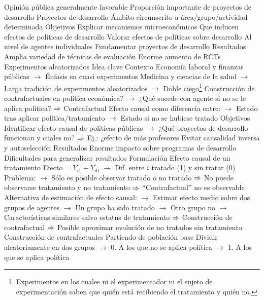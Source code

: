 \documentclass{nuevotema}
\begin{document}
\begin{esquemal}
				\4[] Opinión pública generalmente favorable
				\4[] Proporción importante de proyectos de desarrollo
				\4 Proyectos de desarrollo
				\4[] Ámbito circunscrito a área/grupo/actividad determinada
				\4[]
			\3 Objetivos
				\4 Explicar mecanismos microeconómicos
				\4[] Que inducen efectos de políticas de desarrollo
				\4 Valorar efectos de políticas sobre desarrollo
				\4[] Al nivel de agentes individuales
				\4 Fundamentar proyectos de desarrollo
			\3 Resultados
				\4 Amplia variedad de técnicas de evaluación
				\4 Enorme aumento de RCTs
		\2 Experimentos aleatorizados
			\3 Idea clave
				\4 Contexto
				\4[] Economía laboral y finanzas públicas
				\4[] $\to$ Énfasis en cuasi experimentos
				\4[] Medicina y ciencias de la salud
				\4[] $\to$ Larga tradición de experimentos aleatorizados
				\4[] $\to$ Doble ciego\footnote{Experimentos en los cuales ni el experimentador ni el sujeto de experimentación saben que quién está recibiendo el tratamiento y quién no.}
				\4[] Construcción de contrafactuales en política económica?
				\4[] $\to$ ¿Qué sucede con agente si no se le aplica política?
				\4[] $\Rightarrow$ Contrafactual
				\4[] Efecto causal como diferencia entre:
				\4[] $\to$ Estado tras aplicar política/tratamiento
				\4[] $\to$ Estado si no se hubiese tratado
				\4 Objetivos
				\4[] Identificar efecto causal de políticas públicas
				\4[] $\to$ ¿Qué proyectos de desarrollo funcionan y cuales no?
				\4[] $\Rightarrow$ Ej.: ¿efecto de más profesores
				\4[] Evitar causalidad inversa y autoselección
				\4 Resultados
				\4[] Enorme impacto sobre programas de desarrollo
				\4[] Dificultades para generalizar resultados
			\3 Formulación
				\4 Efecto causal de un tratamiento
				\4[] Efecto = $Y_{i1} - Y_{i0}$
				\4[] $\to$ Dif. entre $i$ tratado (1) y sin tratar (0)
				\4[] Problema:
				\4[] $\to$ Sólo es posible observar tratado o no tratado
				\4[] $\Rightarrow$ No puede observarse tratamiento y no tratamiento
				\4[] $\Rightarrow$ ``Contrafactual'' no es observable
				\4[] Alternativa de estimación de efecto causal:
				\4[] $\to$ Estimar efecto medio sobre dos grupos de agentes
				\4[] $\to$ Un grupo ha sido tratado
				\4[] $\to$ Otro grupo no
				\4[] $\to$ Características similares salvo estatus de tratamiento
				\4[] $\Rightarrow$ Construcción de contrafactual
				\4[] $\Rightarrow$ Posible aproximar evolución de no tratados sin tratamiento
				\4 Construcción de contrafactuales
				\4[] Partiendo de población base
				\4[] Dividir aleatoriamente en dos grupos
				\4[] $\to$ 0. A los que no se aplica política
				\4[] $\to$ 1. A los que se aplica política

\end{esquemal}
\end{document}
